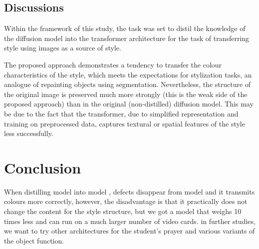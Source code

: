 \documentclass{article}
\begin{document}
\subsection{Discussions}
Within the framework of this study, the task was set to distil the knowledge of the diffusion model into the transformer architecture for the task of transferring style using images as a source of style.

The proposed approach demonstrates a tendency to transfer the colour characteristics of the style, which meets the expectations for stylization tasks, an analogue of repainting objects using segmentation. Nevertheless, the structure of the original image is preserved much more strongly (this is the weak side of the proposed approach) than in the original (non-distilled) diffusion model. This may be due to the fact that the transformer, due to simplified representation and training on preprocessed data, captures textural or spatial features of the style less successfully.

\section{Conclusion}
\label{sec:conclusion}
When distilling model \cite{method 4} into model \cite{method 5}, defects disappear from model \cite{method 4} and it transmits colours more correctly, however, the disadvantage is that it practically does not change the content for the style structure, but we got a model that weighs 10 times less and can run on a much larger number of video cards. in further studies, we want to try other architectures for the student's prayer and various variants of the object function.



\end{document}
